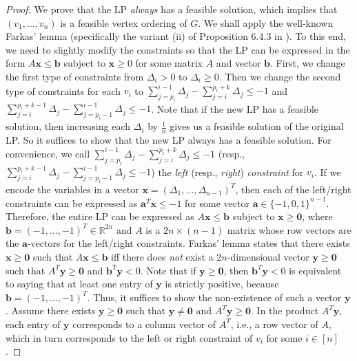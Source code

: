 \documentclass[11pt]{article}
\begin{document}
\begin{proof}
We prove that the LP \textit{always} has a feasible solution, which implies that $(v_1,\dots,v_n)$ is a feasible vertex ordering of $G$.
We shall apply the well-known Farkas' lemma (specifically the variant (ii) of Proposition 6.4.3 in \cite{farkas-book}).
To this end, we need to slightly modify the constraints so that the LP can be expressed in the form $A \mathbf{x} \leq \mathbf{b}$ subject to $\mathbf{x} \geq 0$ for some matrix $A$ and vector $\mathbf{b}$.
First, we change the first type of constraints from $\Delta_i > 0$ to $\Delta_i \geq 0$.
Then we change the second type of constraints for each $v_i$ to $\sum_{j=p_i}^{i-1} \Delta_j - \sum_{j=i}^{p_i+k} \Delta_j \leq -1$ and $\sum_{j=i}^{p_i+k-1} \Delta_j - \sum_{j=p_i-1}^{i-1} \Delta_j \leq -1$.
Note that if the new LP has a feasible solution, then increasing each $\Delta_i$ by $\frac{1}{n}$ gives us a feasible solution of the original LP.
So it suffices to show that the new LP always has a feasible solution.
For convenience, we call $\sum_{j=p_i}^{i-1} \Delta_j - \sum_{j=i}^{p_i+k} \Delta_j \leq -1$ (resp., $\sum_{j=i}^{p_i+k-1} \Delta_j - \sum_{j=p_i-1}^{i-1} \Delta_j \leq -1$) the \textit{left} (resp., \textit{right}) \textit{constraint} for $v_i$.
If we encode the variables in a vector $\mathbf{x} = (\Delta_1,\dots,\Delta_{n-1})^T$, then each of the left/right constraints can be expressed as $\mathbf{a}^T \mathbf{x} \leq -1$ for some vector $\mathbf{a} \in \{-1,0,1\}^{n-1}$.
Therefore, the entire LP can be expressed as $A \mathbf{x} \leq \mathbf{b}$ subject to $\mathbf{x} \geq \mathbf{0}$, where $\mathbf{b} = (-1,\dots,-1)^T \in \mathbb{R}^{2n}$ and $A$ is a $2n \times (n-1)$ matrix whose row vectors are the $\mathbf{a}$-vectors for the left/right constraints.
Farkas' lemma states that there exists $\mathbf{x} \geq \mathbf{0}$ such that $A \mathbf{x} \leq \mathbf{b}$ iff there does \textit{not} exist a $2n$-dimensional vector $\mathbf{y} \geq \mathbf{0}$ such that $A^T \mathbf{y} \geq \mathbf{0}$ and $\mathbf{b}^T \mathbf{y} < 0$.
Note that if $\mathbf{y} \geq \mathbf{0}$, then $\mathbf{b}^T \mathbf{y} < 0$ is equivalent to saying that at least one entry of $\mathbf{y}$ is strictly positive, because $\mathbf{b} = (-1,\dots,-1)^T$.
Thus, it suffices to show the non-existence of such a vector $\mathbf{y}$.
Assume there exists $\mathbf{y} \geq \mathbf{0}$ such that $\mathbf{y} \neq \mathbf{0}$ and $A^T \mathbf{y} \geq \mathbf{0}$.
In the product $A^T \mathbf{y}$, each entry of $\mathbf{y}$ corresponds to a column vector of $A^T$, i.e., a row vector of $A$, which in turn corresponds to the left or right constraint of $v_i$ for some $i \in [n]$.

\end{proof}
\end{document}
